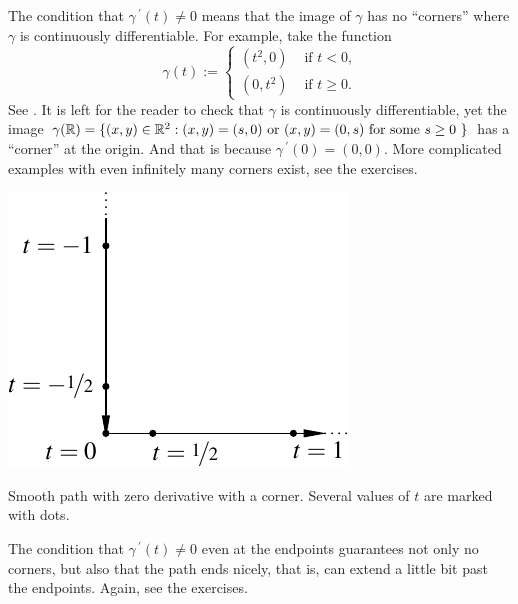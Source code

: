\begin{example}
The condition that $\gamma^{\:\prime}(t) \not= 0$ means that the image of $\gamma$
has no ``corners'' where $\gamma$ is continuously differentiable.  For example,
take the function
\begin{equation*}
\gamma(t) :=
\begin{cases}
(t^2,0) & \text{ if $t < 0$,}\\
(0,t^2) & \text{ if $t \geq 0$.}
\end{cases}
\end{equation*}
See .
It is left for the reader to check that $\gamma$ is continuously
differentiable, yet the image $\gamma({\mathbb{R}}) = \{ (x,y) \in {\mathbb{R}}^2 : (x,y) =
(s,0) \text{ or } (x,y) = (0,s) \text{ for some $s \geq 0$ } \}$ has a
``corner'' at the origin.  And that is because $\gamma^{\:\prime}(0) = (0,0)$.
More complicated examples with even infinitely many corners exist,
see the exercises.
\begin{myfigureht}
\includegraphics{figures/cornersmoothpath}
\caption{Smooth path with zero derivative with a corner.  Several values of
$t$ are marked with dots.\label{fig:cornersmoothpath}}
\end{myfigureht}
\end{example}

The condition that $\gamma^{\:\prime}(t) \not= 0$ even at the endpoints guarantees
not only no corners, but also that the path ends nicely, that is, can
extend a little bit past the endpoints.  Again, see the exercises.

